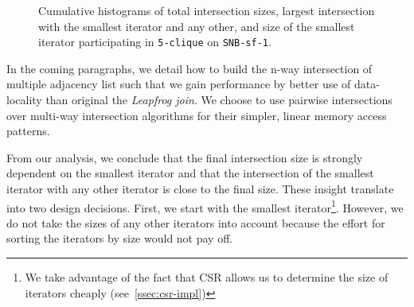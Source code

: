 \begin{figure}[H]
  \centering
  \hfill
  \hfill
  \caption{Cumulative histograms of total intersection sizes, largest intersection with the smallest iterator and any other, and size of the
    smallest iterator participating in \texttt{5-clique} on \texttt{SNB-sf-1}.}
  \label{fig:intersection-workload}
\end{figure}

In the coming paragraphs, we detail how to build the n-way intersection of multiple adjacency list
such that we gain performance by better use of data-locality than original the \textit{Leapfrog join}.
We choose to use pairwise intersections over multi-way intersection algorithms for their simpler,
linear memory access patterns.

From our analysis, we conclude that the final intersection size is strongly dependent on the
smallest iterator and that the intersection of the smallest iterator with any other iterator is
close to the final size.
These insight translate into two design decisions.
First, we start with the smallest iterator\footnote{We take advantage of the fact that CSR allows us
to determine the size of iterators cheaply (see~\cref{ssec:csr-impl})}.
However, we do not take the sizes of any other iterators into account because the effort for
sorting the iterators by size would not pay off.

